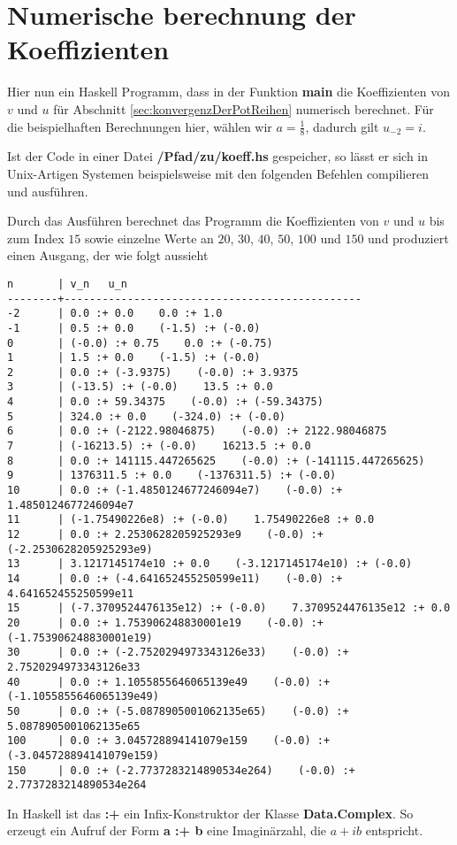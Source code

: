 \chapter{Numerische berechnung der Koeffizienten} \label{anh:Programm}
Hier nun ein Haskell Programm, dass in der Funktion \textbf{main} die
Koeffizienten von $v$ und $u$ für Abschnitt \ref{sec:konvergenzDerPotReihen} 
numerisch berechnet. Für die beispielhaften Berechnungen hier, wählen wir
$a=\frac{1}{8}$, dadurch gilt $u_{-2}=i$.


Ist der Code in einer Datei \textbf{/Pfad/zu/koeff.hs} gespeicher, so lässt er
sich in Unix-Artigen Systemen beispielsweise mit den folgenden Befehlen
compilieren und ausführen.

Durch das Ausführen berechnet das Programm die Koeffizienten von $v$ und $u$
bis zum Index $15$ sowie einzelne Werte an $20$, $30$, $40$, $50$, $100$ und
$150$ und produziert einen Ausgang, der wie folgt aussieht
\begin{lstlisting}[style=Bash]
n       | v_n   u_n
--------+-----------------------------------------------
-2      | 0.0 :+ 0.0    0.0 :+ 1.0
-1      | 0.5 :+ 0.0    (-1.5) :+ (-0.0)
0       | (-0.0) :+ 0.75    0.0 :+ (-0.75)
1       | 1.5 :+ 0.0    (-1.5) :+ (-0.0)
2       | 0.0 :+ (-3.9375)    (-0.0) :+ 3.9375
3       | (-13.5) :+ (-0.0)    13.5 :+ 0.0
4       | 0.0 :+ 59.34375    (-0.0) :+ (-59.34375)
5       | 324.0 :+ 0.0    (-324.0) :+ (-0.0)
6       | 0.0 :+ (-2122.98046875)    (-0.0) :+ 2122.98046875
7       | (-16213.5) :+ (-0.0)    16213.5 :+ 0.0
8       | 0.0 :+ 141115.447265625    (-0.0) :+ (-141115.447265625)
9       | 1376311.5 :+ 0.0    (-1376311.5) :+ (-0.0)
10      | 0.0 :+ (-1.4850124677246094e7)    (-0.0) :+ 1.4850124677246094e7
11      | (-1.75490226e8) :+ (-0.0)    1.75490226e8 :+ 0.0
12      | 0.0 :+ 2.2530628205925293e9    (-0.0) :+ (-2.2530628205925293e9)
13      | 3.1217145174e10 :+ 0.0    (-3.1217145174e10) :+ (-0.0)
14      | 0.0 :+ (-4.641652455250599e11)    (-0.0) :+ 4.641652455250599e11
15      | (-7.3709524476135e12) :+ (-0.0)    7.3709524476135e12 :+ 0.0
20      | 0.0 :+ 1.753906248830001e19    (-0.0) :+ (-1.753906248830001e19)
30      | 0.0 :+ (-2.7520294973343126e33)    (-0.0) :+ 2.7520294973343126e33
40      | 0.0 :+ 1.1055855646065139e49    (-0.0) :+ (-1.1055855646065139e49)
50      | 0.0 :+ (-5.0878905001062135e65)    (-0.0) :+ 5.0878905001062135e65
100     | 0.0 :+ 3.045728894141079e159    (-0.0) :+ (-3.045728894141079e159)
150     | 0.0 :+ (-2.7737283214890534e264)    (-0.0) :+ 2.7737283214890534e264
\end{lstlisting}
In Haskell ist das \textbf{:+} ein Infix-Konstruktor der Klasse
\textbf{Data.Complex}. So erzeugt ein Aufruf der Form \textbf{a :+ b} eine
Imaginärzahl, die $a+ib$ entspricht.

